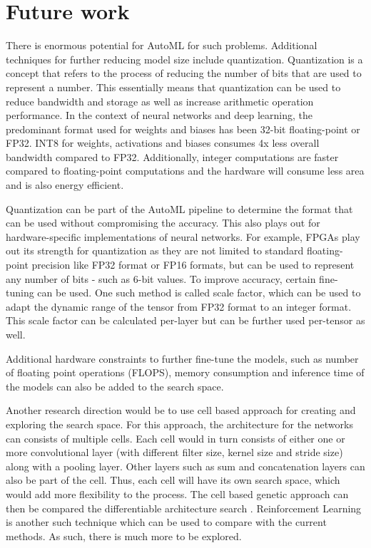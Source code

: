 \section{Future work}
\label{sec:future_work}

There is enormous potential for AutoML for such problems. Additional techniques for further reducing model size include quantization. Quantization is a concept that refers to the process of reducing the number of bits that are used to represent a number. This essentially means that quantization can be used to reduce bandwidth and storage as well as increase arithmetic operation performance. In the context of neural networks and deep learning, the predominant format used for weights and biases has been 32-bit floating-point or FP32. INT8 for weights, activations and biases consumes 4x less overall bandwidth compared to FP32. Additionally, integer computations are faster compared to floating-point computations and the hardware will consume less area and is also energy efficient.

Quantization can be part of the AutoML pipeline to determine the format that can be used without compromising the accuracy. This also plays out for hardware-specific implementations of neural networks. For example, FPGAs play out its strength for quantization as they are not limited to standard floating-point precision like FP32 format or FP16 formats, but can be used to represent any number of bits - such as 6-bit values. To improve accuracy, certain fine-tuning can be used. One such method is called scale factor, which can be used to adapt the dynamic range of the tensor from FP32 format to an integer format. This scale factor can be calculated per-layer but can be further used per-tensor as well.

Additional hardware constraints to further fine-tune the models, such as number of floating point operations (FLOPS), memory consumption and inference time of the models can also be added to the search space. 

Another research direction would be to use cell based approach for creating and exploring the search space. For this approach, the architecture for the networks can consists of multiple cells. Each cell would in turn consists of either one or more convolutional layer (with different filter size, kernel size and stride size) along with a pooling layer. Other layers such as sum and concatenation layers can also be part of the cell. Thus, each cell will have its own search space, which would add more flexibility to the process. The cell based genetic approach can then be compared the differentiable architecture search \cite{liu2018darts}. Reinforcement Learning is another such technique which can be used to compare with the current methods. As such, there is much more to be explored.
